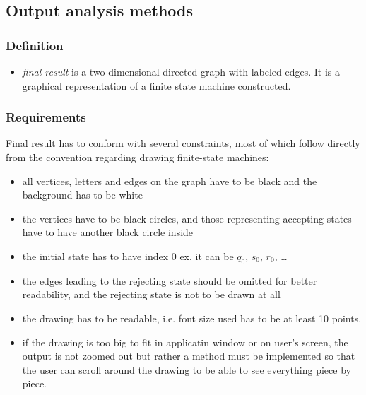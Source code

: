 \documentclass{article}
\begin{document}
\subsection{Output analysis methods}

\subsubsection*{Definition}
\begin{itemize}[noitemsep,nolistsep]

  \item \textit{final result} is a two-dimensional directed graph with labeled edges. It is a
  graphical representation of a finite state machine constructed.

\end{itemize}

\subsubsection*{Requirements}
Final result has to conform with several constraints, most of which follow directly from the
convention regarding drawing finite-state machines:
\begin{itemize}

  \item all vertices, letters and edges on the graph have to be black and the background has to be
  white

  \item the vertices have to be black circles, and those representing accepting states have to have
  another black circle inside

  \item the initial state has to have index $0$ ex. it can be $q_0$, $s_0$, $r_0$, \ldots

  \item the edges leading to the rejecting state should be omitted for better readability, and the
  rejecting state is not to be drawn at all

  \item the drawing has to be readable, i.e. font size used has to be at least 10 points.

  \item if the drawing is too big to fit in applicatin window or on user's screen, the output is not
  zoomed out but rather a method must be implemented so that the user can scroll around the drawing
  to be able to see everything piece by piece.

\end{itemize}
\end{document}
